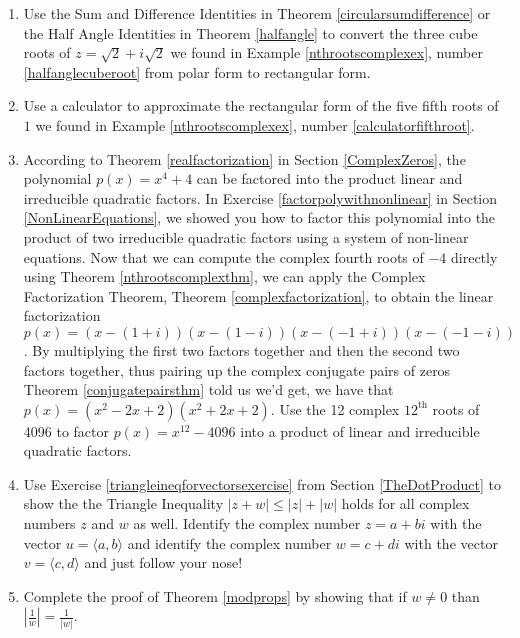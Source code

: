 \begin{enumerate}

\setcounter{enumi}{\value{HW}}

\item Use the Sum and Difference Identities in Theorem \ref{circularsumdifference} or the Half Angle Identities in Theorem \ref{halfangle} to convert the three cube roots of $z=\sqrt{2} + i\sqrt{2}$ we found in  Example \ref{nthrootscomplexex}, number \ref{halfanglecuberoot} from polar form to rectangular form.

\item Use a calculator to approximate the rectangular form of the five fifth roots of $1$ we found in Example \ref{nthrootscomplexex}, number \ref{calculatorfifthroot}.

\item According to Theorem \ref{realfactorization} in Section \ref{ComplexZeros}, the polynomial $p(x) = x^{4} + 4$ can be factored into the product linear and irreducible quadratic factors.  In Exercise \ref{factorpolywithnonlinear} in Section \ref{NonLinearEquations}, we showed you how to factor this polynomial into the product of two irreducible quadratic factors using a system of non-linear equations.  Now that we can compute the complex fourth roots of $-4$ directly using  Theorem \ref{nthrootscomplexthm}, we can  apply the Complex Factorization Theorem, Theorem \ref{complexfactorization}, to obtain the linear factorization $p(x) = (x - (1 + i))(x - (1 - i))(x - (-1 + i))(x - (-1 - i))$.  By multiplying the first two factors together and then the second two factors together, thus pairing up the complex conjugate pairs of zeros Theorem \ref{conjugatepairsthm} told us we'd get, we have that $p(x) = (x^{2} - 2x + 2)(x^{2} + 2x + 2)$.  Use the 12 complex $12^{\text{th}}$ roots of 4096 to factor $p(x) = x^{12} - 4096$ into a product of linear and irreducible quadratic factors.


\item Use Exercise \ref{triangleineqforvectorsexercise} from Section \ref{TheDotProduct} to show the the Triangle Inequality $|z + w| \leq |z| + |w|$ holds for all complex numbers $z$ and $w$ as well.  Identify the complex number $z = a + bi$ with the vector $u = \langle a, b \rangle$ and identify the complex number $w = c + di$ with the vector $v = \langle c, d \rangle$ and just follow your nose!


\item Complete the proof of Theorem \ref{modprops} by showing that if $w \neq 0$ than  $\left| \frac{1}{w}\right| = \frac{1}{|w|}$.


\end{enumerate}
